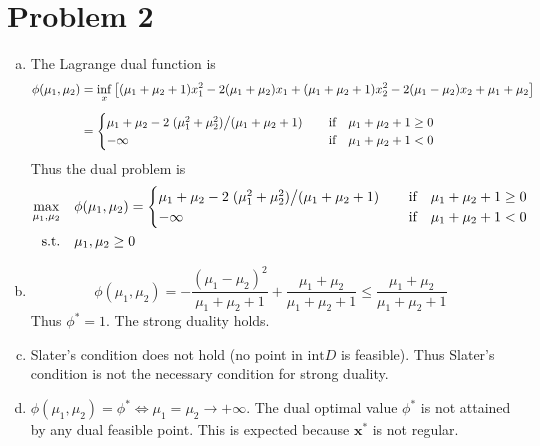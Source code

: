 \documentclass{article}
\def\bx{\boldsymbol{x}}
\begin{document}
\section*{Problem 2}
\begin{enumerate}[(a)]
    \item
		The Lagrange dual function is
        \[
            \begin{aligned}
				\phi(\mu_1,\mu_2)&=
				\inf_x\qty[
					(\mu_1+\mu_2+1)x_1^2
					-2(\mu_1+\mu_2)x_1
					+(\mu_1+\mu_2+1)x_2^2
					-2(\mu_1-\mu_2)x_2
					+\mu_1+\mu_2
				]
				\\[5pt]&=
				\begin{cases}
					\mu_1+\mu_2
					-2\flatfrac
					{(\mu_1^2+\mu_2^2)}{(\mu_1+\mu_2+1)}
					&\qif \mu_1+\mu_2+1\ge0
					\\
					-\infty &\qif \mu_1+\mu_2+1<0
				\end{cases}
            \end{aligned}
        \]
		Thus the dual problem is
		\[
			\begin{aligned}
				\max_{\mu_1,\mu_2}\ \ \ &
				\phi(\mu_1,\mu_2)=
				\begin{cases}
					\mu_1+\mu_2
					-2\flatfrac
					{(\mu_1^2+\mu_2^2)}{(\mu_1+\mu_2+1)}
					&\qif \mu_1+\mu_2+1\ge0
					\\
					-\infty &\qif \mu_1+\mu_2+1<0
				\end{cases}
				\\
				\qq*{s.t.} &\mu_1,\mu_2\ge 0
			\end{aligned}
		\] 
    \item
		\[
			\phi(\mu_1,\mu_2)
			=-\frac{(\mu_1-\mu_2)^2}{\mu_1+\mu_2+1}+
			\frac{\mu_1+\mu_2}{\mu_1+\mu_2+1}
			\le
			\frac{\mu_1+\mu_2}{\mu_1+\mu_2+1}
		\]
		Thus $\phi^*=1$. The strong duality holds.
	\item
		Slater’s condition does not hold (no point in $\mbox{int} D$ is feasible). Thus Slater’s condition is not the necessary condition for strong duality.
	\item
		$\phi(\mu_1,\mu_2)=\phi^*\iff\mu_1=\mu_2\to+\infty$.
		The dual optimal value $\phi^*$ is not attained by any dual feasible point.
		This is expected because $\bx^*$ is not regular.
\end{enumerate}
\end{document}
